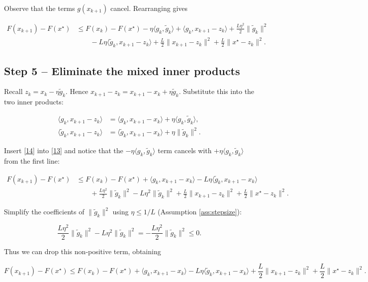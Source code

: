 \documentclass[11pt]{article}
\begin{document}
Observe that the terms $g(x_{k+1})$ cancel.  Rearranging gives

\[
\begin{aligned}
F(x_{k+1})-F(x^{\star})
&\le F(x_{k})-F(x^{\star})
-\eta\langle g_{k},\tilde g_{k}\rangle
+\langle g_{k},x_{k+1}-z_{k}\rangle
+\frac{L\eta^{2}}{2}\|\tilde g_{k}\|^{2}\\
&\qquad
-L\eta\langle\tilde g_{k},x_{k+1}-z_{k}\rangle
+\frac{L}{2}\|x_{k+1}-z_{k}\|^{2}
+\frac{L}{2}\|x^{\star}-z_{k}\|^{2}.
\end{aligned}
\tag{13}
\]

\subsection*{Step 5 – Eliminate the mixed inner products}
Recall $z_{k}=x_{k}-\eta\tilde g_{k}$.  Hence $x_{k+1}-z_{k}=x_{k+1}-x_{k}+\eta\tilde g_{k}$.  Substitute this into the two inner products:

\[
\begin{aligned}
\langle g_{k},x_{k+1}-z_{k}\rangle
&=\langle g_{k},x_{k+1}-x_{k}\rangle
+\eta\langle g_{k},\tilde g_{k}\rangle,\\
\langle\tilde g_{k},x_{k+1}-z_{k}\rangle
&=\langle\tilde g_{k},x_{k+1}-x_{k}\rangle
+\eta\|\tilde g_{k}\|^{2}.
\end{aligned}
\tag{14}
\]

Insert \eqref{14} into \eqref{13} and notice that the $-\eta\langle g_{k},\tilde g_{k}\rangle$ term cancels with $+\eta\langle g_{k},\tilde g_{k}\rangle$ from the first line:

\[
\begin{aligned}
F(x_{k+1})-F(x^{\star})
&\le F(x_{k})-F(x^{\star})
+\langle g_{k},x_{k+1}-x_{k}\rangle
-\!L\eta\langle\tilde g_{k},x_{k+1}-x_{k}\rangle\\
&\qquad
+\frac{L\eta^{2}}{2}\|\tilde g_{k}\|^{2}
-\!L\eta^{2}\|\tilde g_{k}\|^{2}
+\frac{L}{2}\|x_{k+1}-z_{k}\|^{2}
+\frac{L}{2}\|x^{\star}-z_{k}\|^{2}.
\end{aligned}
\tag{15}
\]

Simplify the coefficients of $\|\tilde g_{k}\|^{2}$ using $\eta\le1/L$ (Assumption \ref{ass:stepsize}):

\[
\frac{L\eta^{2}}{2}\|\tilde g_{k}\|^{2}-L\eta^{2}\|\tilde g_{k}\|^{2}
= -\frac{L\eta^{2}}{2}\|\tilde g_{k}\|^{2}\le 0.
\tag{16}
\]

Thus we can drop this non‑positive term, obtaining

\[
F(x_{k+1})-F(x^{\star})
\le F(x_{k})-F(x^{\star})
+\langle g_{k},x_{k+1}-x_{k}\rangle
-L\eta\langle\tilde g_{k},x_{k+1}-x_{k}\rangle
+\frac{L}{2}\|x_{k+1}-z_{k}\|^{2}
+\frac{L}{2}\|x^{\star}-z_{k}\|^{2}.
\tag{17}
\]
\end{document}
